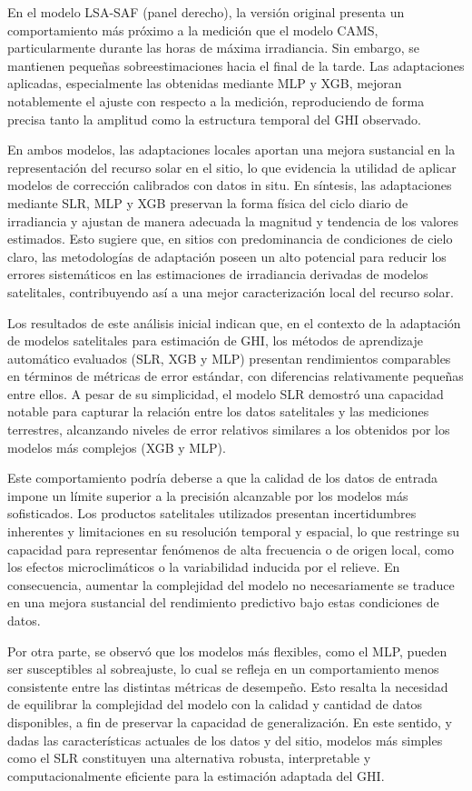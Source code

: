 En el modelo LSA-SAF (panel derecho), la versión original presenta un comportamiento más próximo a la medición que el modelo CAMS, particularmente durante las horas de máxima irradiancia. Sin embargo, se mantienen pequeñas sobreestimaciones hacia el final de la tarde. Las adaptaciones aplicadas, especialmente las obtenidas mediante MLP y XGB, mejoran notablemente el ajuste con respecto a la medición, reproduciendo de forma precisa tanto la amplitud como la estructura temporal del GHI observado.

En ambos modelos, las adaptaciones locales aportan una mejora sustancial en la representación del recurso solar en el sitio, lo que evidencia la utilidad de aplicar modelos de corrección calibrados con datos in situ. En síntesis, las adaptaciones mediante SLR, MLP y XGB preservan la forma física del ciclo diario de irradiancia y ajustan de manera adecuada la magnitud y tendencia de los valores estimados. Esto sugiere que, en sitios con predominancia de condiciones de cielo claro, las metodologías de adaptación poseen un alto potencial para reducir los errores sistemáticos en las estimaciones de irradiancia derivadas de modelos satelitales, contribuyendo así a una mejor caracterización local del recurso solar.

Los resultados de este análisis inicial indican que, en el contexto de la adaptación de modelos satelitales para estimación de GHI, los métodos de aprendizaje automático evaluados (SLR, XGB y MLP) presentan rendimientos comparables en términos de métricas de error estándar, con diferencias relativamente pequeñas entre ellos. A pesar de su simplicidad, el modelo SLR demostró una capacidad notable para capturar la relación entre los datos satelitales y las mediciones terrestres, alcanzando niveles de error relativos similares a los obtenidos por los modelos más complejos (XGB y MLP).

Este comportamiento podría deberse a que la calidad de los datos de entrada impone un límite superior a la precisión alcanzable por los modelos más sofisticados. Los productos satelitales utilizados presentan incertidumbres inherentes y limitaciones en su resolución temporal y espacial, lo que restringe su capacidad para representar fenómenos de alta frecuencia o de origen local, como los efectos microclimáticos o la variabilidad inducida por el relieve. En consecuencia, aumentar la complejidad del modelo no necesariamente se traduce en una mejora sustancial del rendimiento predictivo bajo estas condiciones de datos.

Por otra parte, se observó que los modelos más flexibles, como el MLP, pueden ser susceptibles al sobreajuste, lo cual se refleja en un comportamiento menos consistente entre las distintas métricas de desempeño. Esto resalta la necesidad de equilibrar la complejidad del modelo con la calidad y cantidad de datos disponibles, a fin de preservar la capacidad de generalización. En este sentido, y dadas las características actuales de los datos y del sitio, modelos más simples como el SLR constituyen una alternativa robusta, interpretable y computacionalmente eficiente para la estimación adaptada del GHI.

